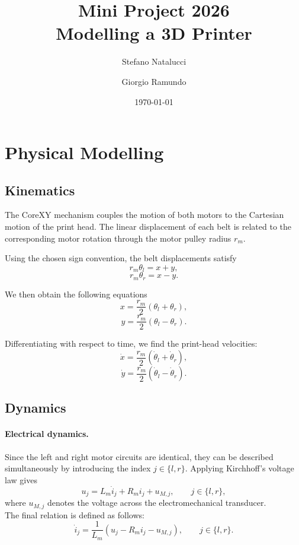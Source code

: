 \documentclass[11pt,a4paper]{article}
\title{\textbf{Mini Project 2026}\\
Modelling a 3D Printer}
\author{
Stefano Natalucci \and
Giorgio Ramundo
}
\date{\today}
\begin{document}
\maketitle

\tableofcontents


\section{Physical Modelling}
\subsection{Kinematics}

The CoreXY mechanism couples the motion of both motors to the Cartesian
motion of the print head. The linear displacement
of each belt is related to the corresponding motor rotation through the
motor pulley radius $r_m$.

Using the chosen sign convention, the belt displacements satisfy
\begin{equation}
r_m\theta_l = x+y,
\end{equation}
\begin{equation}
r_m\theta_r = x-y.
\end{equation}

We then obtain the following equations
\begin{equation}
x = \frac{r_m}{2}\left(\theta_l+\theta_r\right),
\end{equation}
\begin{equation}
y = \frac{r_m}{2}\left(\theta_l-\theta_r\right).
\end{equation}

Differentiating with respect to time, we find the print-head velocities:
\begin{equation}
\dot{x} = \frac{r_m}{2}
\left(\dot{\theta}_l+\dot{\theta}_r\right),
\end{equation}
\begin{equation}
\dot{y} = \frac{r_m}{2}
\left(\dot{\theta}_l-\dot{\theta}_r\right).
\end{equation}


\subsection{Dynamics}
\paragraph{Electrical dynamics.}
Since the left and right motor circuits are identical, they can be
described simultaneously by introducing the index $j\in\{l,r\}$.
Applying Kirchhoff's voltage law gives
\begin{equation}
u_j = L_m\dot{i}_j + R_m i_j + u_{M,j},
\qquad j\in\{l,r\},
\end{equation}
where $u_{M,j}$ denotes the voltage across the electromechanical
transducer.\\
The final relation is defined as follows:
\begin{equation}
\dot{i}_j=
\frac{1}{L_m}
\left(
u_j-R_m i_j-u_{M,j}
\right),
\qquad j\in\{l,r\}.
\end{equation}
\end{document}
